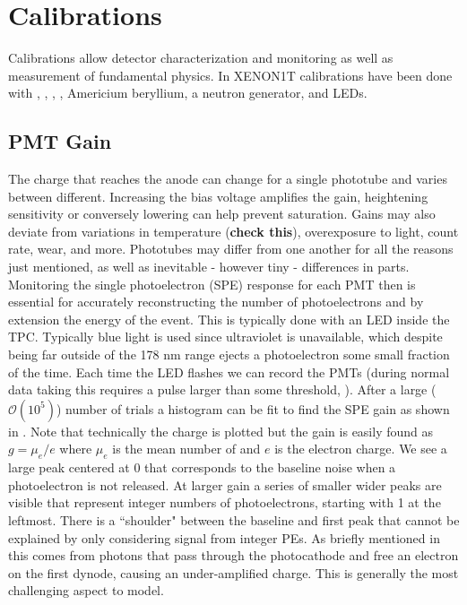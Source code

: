 \section{Calibrations}
\label{sec:calibrations}
Calibrations allow detector characterization and monitoring as well as measurement of fundamental physics.  In XENON1T calibrations have
been done with , , , , Americium beryllium, a neutron generator, and LEDs.


\subsection{PMT Gain}
\label{subsec:calibrations_pmt_gain}
The charge that reaches the anode can change for a single phototube and varies between different.  Increasing the bias voltage amplifies
the gain, heightening sensitivity or conversely lowering can help prevent saturation.  Gains may also deviate from variations in
temperature (\textbf{check this}), overexposure to light, count rate, wear, and more.  Phototubes may differ from one another
for all the reasons just mentioned, as well as inevitable - however tiny - differences in parts.  Monitoring the single photoelectron (SPE)
response for each PMT then is essential for accurately reconstructing the number of photoelectrons and by extension the energy of the
event.  This is typically done with an LED inside the TPC.  Typically blue light is used since ultraviolet is unavailable, which despite
being far outside of the 178 nm range ejects a photoelectron some small fraction of the time.  Each time the LED flashes we can record the
PMTs (during normal data taking this requires a pulse larger than some threshold, \secref{}).  After a large ($\mathcal{O}(10^{5})$)
number of trials a histogram can be fit to find the SPE gain as shown in .  Note that technically the charge
is plotted but the gain is easily found as $g = \mu_{e} / e$ where $\mu_{e}$ is the mean number of \electron and $e$ is the electron charge.  We
see a large peak centered at 0 that corresponds to the baseline noise when a photoelectron is not released.  At larger gain a series of
smaller wider peaks are visible that represent integer numbers of photoelectrons, starting with 1 at the leftmost.  There is a ``shoulder"
between the baseline and first peak that cannot be explained by only considering signal from integer PEs.  As briefly mentioned in
 this comes from photons that pass through the photocathode and free an electron on the first dynode, causing an
under-amplified charge.  This is generally the most challenging aspect to model.

